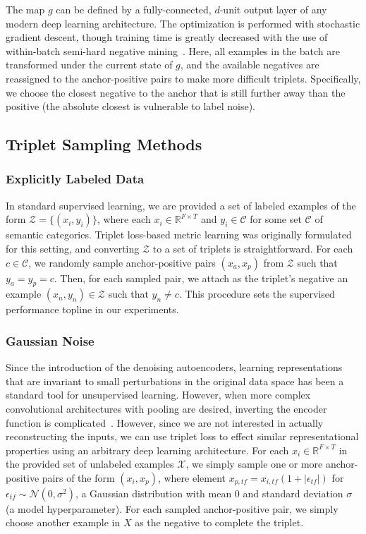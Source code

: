 \documentclass{article}
\begin{document}
The map $g$ can be defined by a fully-connected, $d$-unit output layer of any
modern deep learning architecture.  The optimization is performed with
stochastic gradient descent, though training time is greatly decreased with the
use of within-batch semi-hard negative mining~\cite{schroff2015facenet}.  Here,
all examples in the batch are transformed under the current state of $g$, and
the available negatives are reassigned to the anchor-positive pairs to make more
difficult triplets.  Specifically, we choose the closest negative to the anchor
that is still further away than the positive (the absolute closest is vulnerable
to label noise).



\subsection{Triplet Sampling Methods}
\label{sec:sampling}

\subsubsection{Explicitly Labeled Data}
In standard supervised learning, we are provided a set of labeled examples of
the form $\mathcal{Z}=\{(x_i,y_i)\}$, where each $x_i \in \mathbb{R}^{F\times
  T}$ and $y_i \in \mathcal{C}$ for some set $\mathcal{C}$ of semantic
categories.  Triplet loss-based metric learning was originally formulated for
this setting, and converting $\mathcal{Z}$ to a set of triplets is
straightforward.  For each $c \in \mathcal{C}$, we randomly sample
anchor-positive pairs $(x_a,x_p)$ from $\mathcal{Z}$ such that $y_a=y_p=c$.
Then, for each sampled pair, we attach as the triplet's negative an example
$(x_n,y_n) \in \mathcal{Z}$ such that $y_n \neq c$. This procedure sets the
supervised performance topline in our experiments.

\subsubsection{Gaussian Noise}
Since the introduction of the denoising autoencoders, learning representations
that are invariant to small perturbations in the original data space has been a
standard tool for unsupervised learning.  However, when more complex
convolutional architectures with pooling are desired, inverting the encoder
function is complicated~\cite{masci2011stacked}.  However, since we are not
interested in actually reconstructing the inputs, we can use triplet loss to
effect similar representational properties using an arbitrary deep learning
architecture.  For each $x_i\in\mathbb{R}^{F\times T}$ in the provided set of
unlabeled examples $\mathcal{X}$, we simply sample one or more anchor-positive
pairs of the form $(x_i,x_p)$, where element $x_{p,tf} = x_{i,tf}(1+|\epsilon_{tf}|)$
for $\epsilon_{tf} \sim \mathcal{N}(0,\sigma^2)$, a Gaussian distribution with mean 0
and standard deviation $\sigma$ (a model hyperparameter).  For each sampled
anchor-positive pair, we simply choose another example in $X$ as the negative to
complete the triplet.
\end{document}
